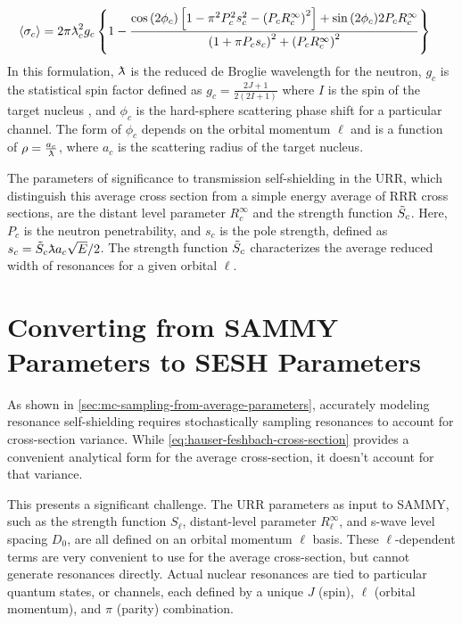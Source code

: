 \begin{equation}
    \label{eq:hauser-feshbach-cross-section}
    \langle \sigma_c \rangle =
    2 \pi \lambdabar_c^2 g_c \left\{
    1 - \frac{
            \cos{ ( 2 \phi_c)} \left[
                1 - \pi^2P_c^2 s_c^2 -  \left( P_c R_c^\infty \right)^2
            \right]
            + \sin{(2 \phi_c)} 2 P_c R_c^\infty
        }{
            \left( 1 + \pi P_c s_c \right)^2 + \left( P_c R_c^\infty \right)^2
    }
    \right\} \quad \text{}
\end{equation}
In this formulation, $\lambdabar$ is the reduced de Broglie wavelength for the neutron, $g_c$ is the statistical spin factor defined as $g_c = \frac{2J + 1}{2(2I + 1)}$ where $I$ is the spin of the target nucleus , and $\phi_c$ is the hard-sphere scattering phase shift for a particular channel. The form of $\phi_c$ depends on the orbital momentum $\ell$ and is a function of $\rho = \frac{a_c}{\lambdabar}$, where $a_c$ is the scattering radius of the target nucleus.

The parameters of significance to transmission self-shielding in the URR, which distinguish this average cross section from a simple energy average of RRR cross sections, are the distant level parameter $R^\infty_c$ and the strength function $\Tilde{S}_c$. Here, $P_c$ is the neutron penetrability, and $s_c$ is the pole strength, defined as $s_c = \Tilde{S}_c\lambdabar a_c \sqrt{E}/2$. The strength function $\Tilde{S}_c$ characterizes the average reduced width of resonances for a given orbital $\ell$.


\section{Converting from SAMMY Parameters to SESH Parameters}
    As shown in \autoref{sec:mc-sampling-from-average-parameters}, accurately modeling resonance self-shielding requires stochastically sampling resonances to account for cross-section variance. While \autoref{eq:hauser-feshbach-cross-section} provides a convenient analytical form for the average cross-section, it doesn't account for that variance. 
    
    This presents a significant challenge. The URR parameters as input to SAMMY, such as the strength function $S_\ell$, distant-level parameter $R_\ell^\infty$, and s-wave level spacing $D_0$, are all defined on an orbital momentum $\ell$ basis. These $\ell$-dependent terms are very convenient to use for the average cross-section, but cannot generate resonances directly. Actual nuclear resonances are tied to particular quantum states, or channels, each defined by a unique $J$ (spin), $\ell$ (orbital momentum), and $\pi$ (parity) combination.


